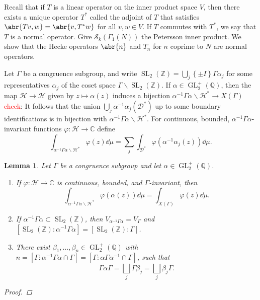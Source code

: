 \documentclass[10pt,leqno,twoside,b5paper]{article}
\theoremstyle{plain}
\newtheorem{lemma}[lem]{Lemma}
\theoremstyle{definition}
\numberwithin{equation}{section}
\numberwithin{lem}{section}
\newcommand{\cbr}[1]{\left\{#1\right\}}
\newcommand{\textib}[1]{\textbf{\textit{#1\index{#1}}}} %
\DeclareMathOperator{\GL}{GL}
\DeclareMathOperator{\SL}{SL}
\newcommand{\slz}{\SL_2(\mathbb{Z})}
\newcommand{\glqp}{\GL_2^+(\mathbb{Q})}
\newcommand{\tbd}{{\Huge\color{red}{\textib{TBD}}}}
\newcommand{\sai}[1]{\textcolor{red}{#1}}
\begin{document}
Recall that if $T$ is a linear operator on the inner product space $V$, then there exists a unique operator $T^\ast$ called the adjoint of $T$ that satisfies $\abr{Tv,w} = \abr{v,T^\ast w}$ for all $v,w\in V$. If $T$ commutes with $T^\ast$, we say that $T$ is a normal operator. Give $\mathcal S_k(\varGamma_1(N))$ the Petersson inner product. We show that the Hecke operators $\abr{n}$ and $T_n$ for $n$ coprime to $N$ are normal operators.

Let $\varGamma$ be a congruence subgroup, and write $\slz = \bigcup_j\cbr{\pm I}\varGamma \alpha_j$ for some representatives $\alpha_j$ of the coset space $\varGamma\backslash \slz$. If $\alpha\in\glqp$, then the map $\mathcal H\to\mathcal H$ given by $z \mapsto \alpha(z)$ induces a bijection $\alpha^{-1}\varGamma\alpha\backslash \mathcal H^\ast\to X(\varGamma)$ \tbd\sai{check}: It follows that the union $\bigcup_j \alpha^{-1}\alpha_j(\mathcal D^\ast)$ up to some boundary identifications is in bijection with $\alpha^{-1}\varGamma\alpha\backslash \mathcal H^\ast$. For continuous, bounded, $\alpha^{-1}\varGamma\alpha$-invariant functions $\varphi\colon \mathcal H\to \mathbb C$ define
\[\int_{\alpha^{-1}\varGamma\alpha\backslash \mathcal H^\ast}\varphi(z)\dd\mu = \sum_j \int_{\mathcal D^\ast}\varphi(\alpha^{-1}\alpha_j(z))\dd\mu.\]

\begin{lemma}
    Let $\varGamma$ be a congruence subgroup and let $\alpha\in\glqp$.\begin{enumerate}[label = \textup{(\alph*)}]
        \item If $\varphi\colon\mathcal H\to\mathbb C$ is continuous, bounded, and $\varGamma$-invariant, then \[\int_{\alpha^{-1}\varGamma\alpha\backslash \mathcal H^\ast}\varphi(\alpha(z))\dd\mu = \int_{X(\varGamma)}\varphi(z)\dd\mu.\]
        \item If $\alpha^{-1}\varGamma\alpha\subset \slz$, then $V_{\alpha^{-1}\varGamma\alpha} = V_\varGamma$ and $[\slz : \alpha^{-1}\varGamma\alpha] = [\slz : \varGamma]$.
        \item There exist $\beta_1,\dots,\beta_n\in \glqp$ with $n=[\varGamma : \alpha^{-1}\varGamma\alpha\cap\varGamma] = [\varGamma : \alpha\varGamma\alpha^{-1}\cap \varGamma]$, such that \[\varGamma\alpha\varGamma = \bigsqcup_j\varGamma \beta_j = \bigsqcup_j\beta_j\varGamma.\]
    \end{enumerate}
    \begin{proof}
        \tbd
    \end{proof}
\end{lemma}
\end{document}
